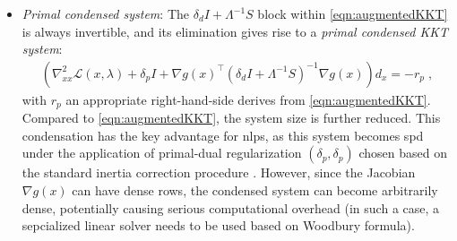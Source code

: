 \documentclass{article}
\begin{document}
\begin{itemize}[leftmargin=*,itemsep=0pt,parsep=0pt,partopsep=0pt]
\item \textit{Primal condensed system}:
The $\delta_d I + \Lambda^{-1}S$ block within \eqref{eqn:augmentedKKT} is always invertible, and its elimination gives rise to a \emph{primal condensed KKT system}:
\begin{align}\label{eqn:kkt_primal}
  \left(\nabla^2_{x x} \mathcal{L}(x, \lambda) + \delta_p I + \nabla g(x)^\top (\delta_d I + \Lambda^{-1} S)^{-1} \nabla g(x)  \right) d_x = - r_p \; ,
\end{align}
with $r_p$ an appropriate right-hand-side derives from \eqref{eqn:augmentedKKT}.
Compared to \cref{eqn:augmentedKKT}, the system size is further reduced.
This condensation has the key advantage for \glspl*{nlp}, as this system becomes \gls*{spd} under the application of primal-dual regularization $(\delta_p, \delta_p)$ chosen based on the standard inertia correction procedure \cite{shinAcceleratingOptimalPower2024}.
However, since the Jacobian $\nabla g(x)$ can have dense rows, the condensed system can become arbitrarily dense, potentially causing serious computational overhead (in such a case, a sepcialized linear solver needs to be used based on Woodbury formula).




\end{itemize}
\end{document}
